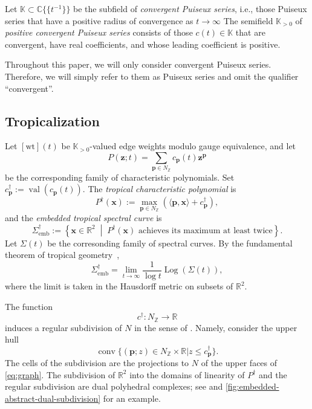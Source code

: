 \documentclass[12pt]{amsart}
\numberwithin{equation}{section}
\theoremstyle{definition}
\newcommand{\Z}{\mathbb{Z}}
\newcommand{\C}{\mathbb{C}}
\newcommand{\R}{\mathbb{R}}
\newcommand{\wt}{\mathrm{wt}}
\newcommand{\val}{\operatorname{val}}
\newcommand{\ra}{\rightarrow}
\def\Log{\operatorname{Log}}
\def\Puis{\mathbb K}
\def\Puispos{\Puis_{>0}}
\def\val{\operatorname{val}}
\def\trop{\dagger}
\def\pt{{\bm{p}}} %
\def\ptR{{\bm{x}}} %
\def\ptC{{\bm{z}}} %
\def\NZ{N_{\Z}}
\def\Conv{\operatorname{conv}}
\def\mcurve{\Sigma}
\def\tropmcurve{\mcurve^\trop}
\begin{document}
Let $\Puis \subset {\mathbb C\{\!\{ t^{-1}\}\!\}}$ be the subfield of \emph{convergent Puiseux series}, i.e., those Puiseux series that have a positive radius of convergence as $t \to \infty$
The semifield $\Puispos$ of \emph{positive convergent Puiseux series} consists of those
$c(t)\in\Puis$ that are convergent, have real coefficients, and whose leading coefficient is positive.

Throughout this paper, we will only consider convergent Puiseux series. Therefore, we will simply refer to them as Puiseux series and omit the qualifier ``convergent''.


\subsection{Tropicalization}

Let $[\wt](t)$ be $\Puispos$-valued edge weights modulo gauge
equivalence, and let
\[
P(\ptC;t)
=
\sum_{\pt \in\NZ}
c_{\pt}(t)\ptC^\pt
\]
be the corresponding family of characteristic polynomials. Set
$
c_{\pt}^\trop:=\val(c_{\pt}(t)).
$
The \emph{tropical characteristic polynomial} is
\begin{equation}
\label{eq:trop_char_poly_formula}
P^\trop(\ptR)
:=
\max_{\pt\in\NZ}
\left(
\langle \pt,\ptR \rangle+c_{\pt}^\trop
\right),
\end{equation}
and the \emph{embedded tropical spectral curve} is
\begin{equation} \label{eq:trop_spc_emb}
\tropmcurve_{\mathrm{emb}}
:=
\left\{
\ptR \in\R^2
\;\middle|\;
P^\trop(\ptR)
\text{ achieves its maximum at least twice}
\right\}.
\end{equation}
Let $\mcurve(t)$ be the corresonding family of spectral curves. By the fundamental theorem of tropical geometry~\cite[Theorem~4.6]{MikhalkinAmoebas},
\begin{equation}
\tropmcurve_{\mathrm{emb}}=\lim_{t\to\infty}\frac{1}{\log t}\Log(\mcurve(t)), 
\label{eq:def_tropicalization_of_hypersurface}
\end{equation} 
where the limit is taken in the Hausdorff metric on subsets of $\R^2$.

The function
\[
c^\trop:\NZ\ra\R
\]
induces a regular subdivision of $N$ in the sense of
\cite{GKZ}. Namely, consider the upper hull
\begin{equation}
\label{eq:graph}
\Conv
\{
(\pt;z)\in\NZ\times\R
|
z\leq c^\trop_{\pt}
\}.
\end{equation}
The cells of the subdivision are the projections to $N$ of the upper faces of
\eqref{eq:graph}. The subdivision of $\R^2$ into the domains of linearity of
$P^\trop$ and the regular subdivision are dual polyhedral
complexes; see
\cite[Proposition~3.1.6]{MaclaganSturmfels} and \cref{fig:embedded-abstract-dual-subdivision} for an example.
\end{document}
